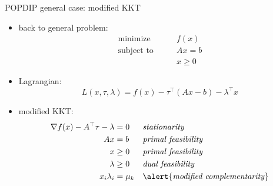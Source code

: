\documentclass[10pt,hyperref,dvipsnames]{beamer}
\newcommand{\grad}{\nabla}
\begin{document}
\begin{frame}{POPDIP general case: modified KKT}

\begin{itemize}
\item back to general problem:
\begin{equation*}
\begin{matrix}
\text{minimize} \qquad & f(x) \\
\text{subject to} \qquad & A x = b \\
 & x \ge 0
\end{matrix}
\end{equation*}
\item Lagrangian:
    $$L(x,\tau,\lambda) = f(x) - \tau^\top (Ax-b) - \lambda^\top x$$
\item modified KKT:
\begin{align*}
\grad f(x) - A^\top \tau - \lambda &= 0   &&\text{\emph{stationarity}} \\
                A x &= b &&\text{\emph{primal feasibility}} \\
                   x &\ge 0 &&\text{\emph{primal feasibility}} \\
             \lambda &\ge 0 &&\text{\emph{dual feasibility}} \\
       x_i \lambda_i &= \mu_k && \text{\alert{\emph{modified complementarity}}}
\end{align*}
\end{itemize}
\end{frame}
\end{document}
